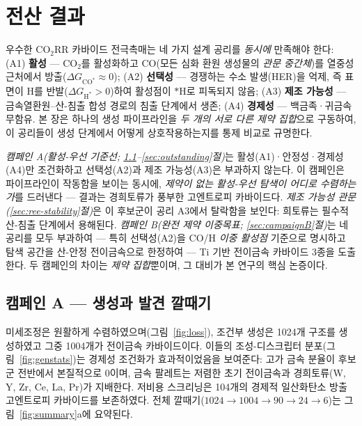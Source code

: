 \documentclass[11pt,a4paper]{report}
\newcommand{\dGCO}{\Delta G_{\mathrm{CO^*}}}
\newcommand{\dGH}{\Delta G_{\mathrm{H^*}}}
\begin{document}
\chapter{전산 결과}
\label{ch:results}

\noindent 우수한 CO$_2$RR 카바이드 전극촉매는 네 가지 설계 공리를 \emph{동시에} 만족해야 한다:
(A1) \textbf{활성} --- CO$_2$를 활성화하고 CO(모든 심화 환원 생성물의 \emph{관문 중간체})를 열중성
근처에서 방출($\dGCO\!\approx\!0$); (A2)
\textbf{선택성} --- 경쟁하는 수소 발생(HER)을 억제, 즉 표면이 H를 반발($\dGH>0$)하여 활성점이
$*$H로 피독되지 않음; (A3) \textbf{제조 가능성} --- 금속열환원--산-침출 합성 경로의 침출 단계에서
생존; (A4) \textbf{경제성} --- 백금족·귀금속 무함유. 본 장은 하나의 생성 파이프라인을 \emph{두 개의
서로 다른 제약 집합}으로 구동하여, 이 공리들이 생성 단계에서 어떻게 상호작용하는지를 통제 비교로
규명한다.

\emph{캠페인 A(활성-우선 기준선; \ref{sec:funnelA}--\ref{sec:outstanding}절)}는 활성(A1)·안정성·경제성(A4)만
조건화하고 선택성(A2)과 제조 가능성(A3)은 부과하지 않는다. 이 캠페인은 파이프라인이 작동함을 보이는
동시에, \emph{제약이 없는 활성-우선 탐색이 어디로 수렴하는가}를 드러낸다 --- 결과는 경희토류가 풍부한
고엔트로피 카바이드다. \emph{제조 가능성 관문(\ref{sec:ree-stability}절)}은 이 후보군이 공리 A3에서
탈락함을 보인다: 희토류는 필수적 산-침출 단계에서 용해된다. \emph{캠페인 B(완전 제약 이중목표;
\ref{sec:campaignB}절)}는 네 공리를 모두 부과하여 --- 특히 선택성(A2)을 CO/H \emph{이중 활성점}
기준으로 명시하고 탐색 공간을 산-안정 전이금속으로 한정하여 --- Ti 기반 전이금속 카바이드 3종을
도출한다. 두 캠페인의 차이는 \emph{제약 집합}뿐이며, 그 대비가 본 연구의 핵심 논증이다.

\section{캠페인 A --- 생성과 발견 깔때기}
\label{sec:funnelA}
미세조정은 원활하게 수렴하였으며(그림~\ref{fig:loss}), 조건부 생성은 1024개 구조를 생성하였고 그중
1004개가 전이금속 카바이드이다. 이들의 조성-디스크립터 분포(그림~\ref{fig:genstats})는 경제성
조건화가 효과적이었음을 보여준다: 고가 금속 분율이 후보군 전반에서 본질적으로 0이며, 금속 팔레트는
저렴한 초기 전이금속과 경희토류(W, Y, Zr, Ce, La, Pr)가 지배한다. 저비용 스크리닝은 104개의 경제적
일산화탄소 방출 고엔트로피 카바이드를 보존하였다. 전체 깔때기($1024 \rightarrow 1004 \rightarrow 90
\rightarrow 24 \rightarrow 6$)는 그림~\ref{fig:summary}a에 요약된다.
\end{document}
